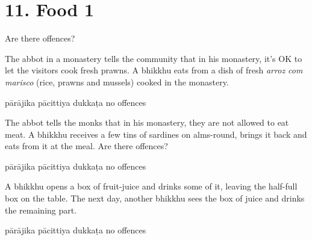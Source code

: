 \chapter{11. Food 1}
\renewcommand*{\theChapterTitle}{11. Food 1}

\begin{exam}{\autoExamName}

\begin{problem*}

  Are there offences?

  \begin{parts}

  \item The abbot in a monastery tells the community that in his monastery, it's OK to let the visitors cook fresh prawns.
    A bhikkhu eats from a dish of fresh \emph{arroz com marisco} (rice, prawns and mussels) cooked in the monastery.

    \bigskip

    \begin{answers}{4}
      \bChoices
       pārājika\eAns
       pācittiya\eAns
       dukkaṭa\eAns
       no offences\eAns
      \eChoices
    \end{answers}

    \bigskip
    
  \item The abbot tells the monks that in his monastery, they are not allowed to eat meat.
    A bhikkhu receives a few tins of sardines on alms-round, brings it back and eats from it at the meal.
    Are there offences?

    \bigskip

    \begin{answers}{4}
      \bChoices
       pārājika\eAns
       pācittiya\eAns
       dukkaṭa\eAns
       no offences\eAns
      \eChoices
    \end{answers}

    \bigskip

  \item A bhikkhu opens a box of fruit-juice and drinks some of it, leaving the
    half-full box on the table. The next day, another bhikkhu sees the box of juice
    and drinks the remaining part.

    \bigskip

    \begin{answers}{4}
      \bChoices
       pārājika\eAns
       pācittiya\eAns
       dukkaṭa\eAns
       no offences\eAns
      \eChoices
    \end{answers}

  \end{parts}

\end{problem*}

\end{exam}

